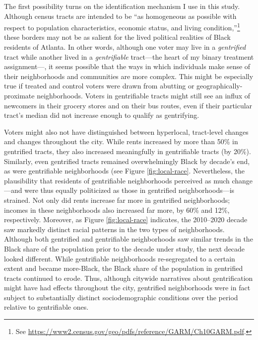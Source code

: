 \documentclass[
  12pt,
]{article}
\begin{document}
The first possibility turns on the identification mechanism I use in this study. Although census tracts are intended to be ``as homogeneous as possible with respect to population characteristics, economic status, and living condition,''\footnote{See \url{https://www2.census.gov/geo/pdfs/reference/GARM/Ch10GARM.pdf}.} these borders may not be as salient for the lived political realities of Black residents of Atlanta. In other words, although one voter may live in a \emph{gentrified} tract while another lived in a \emph{gentrifiable} tract---the heart of my binary treatment assignment---, it seems possible that the ways in which individuals make sense of their neighborhoods and communities are more complex. This might be especially true if treated and control voters were drawn from abutting or geographically-proximate neighborhoods. Voters in gentrifiable tracts might still see an influx of newcomers in their grocery stores and on their bus routes, even if their particular tract's median did not increase enough to qualify as gentrifying.

Voters might also not have distinguished between hyperlocal, tract-level changes and changes throughout the city. While rents increased by more than 50\% in gentrified tracts, they also increased meaningfully in gentrifiable tracts (by 20\%). Similarly, even gentrified tracts remained overwhelmingly Black by decade's end, as were gentrifiable neighborhoods (see Figure \ref{fig:local-race}. Nevertheless, the plausibility that residents of gentrifiable neighborhoods perceived as much change---and were thus equally politicized as those in gentrified neighborhoods---is strained. Not only did rents increase far more in gentrified neighborhoods; incomes in these neighborhoods also increased far more, by 60\% and 12\%, respectively. Moreover, as Figure \ref{fig:local-race} indicates, the 2010--2020 decade saw markedly distinct racial patterns in the two types of neighborhoods. Although both gentrified and gentrifiable neighborhoods saw similar trends in the Black share of the population prior to the decade under study, the next decade looked different. While gentrifiable neighborhoods re-segregated to a certain extent and became more-Black, the Black share of the population in gentrified tracts continued to erode. Thus, although citywide narratives about gentrification might have had effects throughout the city, gentrified neighborhoods were in fact subject to substantially distinct sociodemographic conditions over the period relative to gentrifiable ones.
\end{document}
